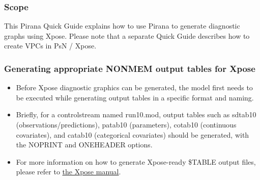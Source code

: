 \begin{center}
   {\colorbox{grey2}{
         \begin{minipage}[t]{0.9\textwidth}
\subsubsection*{Scope}
This Pirana Quick Guide explains how to use Pirana to generate
diagnostic graphs using Xpose. Please note that a separate Quick Guide
describes how to create VPCs in PsN / Xpose.
          \end{minipage}
      }
   }
\end{center}

\subsubsection*{Generating appropriate NONMEM output tables for Xpose}
\begin{itemize}
\item Before Xpose diagnostic graphics can be generated, the model
  first needs to be executed while generating output tables in a
  specific format and naming.
\item Briefly, for a controlstream named run10.mod, output tables such
  as sdtab10 (observations/predictions), patab10 (parameters), cotab10
  (continuous covariates), and catab10 (categorical covariates) should
  be generated, with the NOPRINT and ONEHEADER options.
\item For more information on how to generate Xpose-ready \$TABLE
  output files, please refer to
  \href{'http://xpose.sourceforge.net/manual.pdf''}{the Xpose manual}.
\end{itemize}

